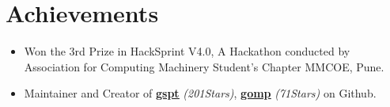 \documentclass[letterpaper,11pt]{article}
\def\gsptstars{201}
\def\gompstars{71}
\begin{document}
\section{Achievements}

\begin{itemize}
    \item Won the 3rd Prize in HackSprint V4.0, A Hackathon conducted by Association for Computing Machinery Student's
Chapter MMCOE, Pune.
    \item Maintainer and Creator of \href{https://github.com/aditya-K2/gspt}{\underline{\textbf{gspt}}} \textit{(\gsptstars  Stars)}, \href{https://github.com/aditya-K2/gomp}{\underline{\textbf{gomp}}} \textit{(\gompstars  Stars)} on Github.
\end{itemize}
\end{document}
